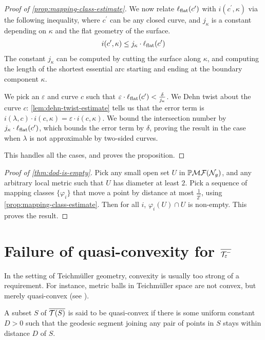 \documentclass[12pt, reqno]{amsart}
\begin{document}
\begin{proof}[Proof of \autoref{prop:mapping-class-estimate}]
  We now relate $\ell_{\mathrm{flat}}(c^{\prime})$ with $i(c^{\prime}, \kappa)$ via the following inequality, where $c^{\prime}$ can be any closed curve, and $j_{\kappa}$ is a constant depending on $\kappa$ and the flat geometry of the surface.
  \begin{align}
    \label{eq:13}
    i(c^{\prime}, \kappa) \leq j_{\kappa} \cdot \ell_{\mathrm{flat}}(c^{\prime})
  \end{align}
  The constant $j_{\kappa}$ can be computed by cutting the surface along $\kappa$, and computing the length of the shortest essential arc starting and ending at the boundary component $\kappa$.

  We pick an $\varepsilon$ and curve $c$ such that $\varepsilon \cdot \ell_{\mathrm{flat}}(c^{\prime}) < \frac{\delta}{j_{\kappa}}$.
  We Dehn twist about the curve $c$: \autoref{lem:dehn-twist-estimate} tells us that the error term is $i(\lambda, c) \cdot i(c, \kappa) = \varepsilon \cdot i(c, \kappa)$.
  We bound the intersection number by $j_{\kappa} \cdot \ell_{\mathrm{flat}}(c^{\prime})$, which bounds the error term by $\delta$, proving the result in the case when $\lambda$ is not approximable by two-sided curves.

  This handles all the cases, and proves the proposition.
\end{proof}

\begin{proof}[Proof of \autoref{thm:dod-is-empty}]
  Pick any small open set $U$ in $\mathbb{P}\mathcal{MF}(\mathcal{N}_g)$, and any arbitrary local metric such that $U$ has diameter at least $2$.
  Pick a sequence of mapping classes $\{\varphi_i\}$ that move a point by distance at most $\frac{1}{2^i}$, using \autoref{prop:mapping-class-estimate}.
  Then for all $i$, $\varphi_i(U) \cap U$ is non-empty.
  This proves the result.
\end{proof}

\section{Failure of quasi-convexity for $\overline{\mathcal{T}_{\varepsilon}^{-}}$}
\label{sec:fail-quasi-conv}

In the setting of Teichm\"uller geometry, convexity is usually too strong of a requirement.
For instance, metric balls in Teichm\"uller space are not convex, but merely quasi-convex (see \autocite{lenzhen2011length}).
\begin{definition}
  A subset $S$ of $\overline{\mathcal{T}(S)}$ is said to be quasi-convex if there is some uniform constant $D > 0$ such that the geodesic segment joining any pair of points in $S$ stays within distance $D$ of $S$.
\end{definition}
\end{document}
